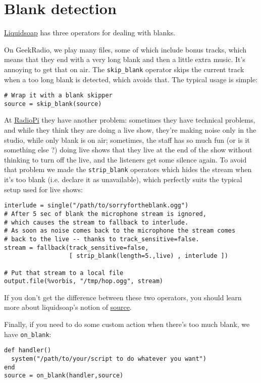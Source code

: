 \section{Blank detection}
\href{index.html}{Liquidsoap} has three operators for dealing with blanks.

On GeekRadio, we play many files, some of which include bonus tracks, which means that they end with a very long blank and then a little extra music. It's annoying to get that on air. The \verb+skip_blank+ operator skips the current track when a too long blank is detected, which avoids that. The typical usage is simple:

\begin{verbatim}
# Wrap it with a blank skipper
source = skip_blank(source)
\end{verbatim}
At \href{http://www.radiopi.org/}{RadioPi} they have another problem: sometimes they have technical problems, and while they think they are doing a live show, they're making noise only in the studio, while only blank is on air; sometimes, the staff has so much fun (or is it something else ?) doing live shows that they live at the end of the show without thinking to turn off the live, and the listeners get some silence again. To avoid that problem we made the \verb+strip_blank+ operators which hides the stream when it's too blank (i.e. declare it as unavailable), which perfectly suits the typical setup used for live shows:

\begin{verbatim}
interlude = single("/path/to/sorryfortheblank.ogg")
# After 5 sec of blank the microphone stream is ignored,
# which causes the stream to fallback to interlude.
# As soon as noise comes back to the microphone the stream comes
# back to the live -- thanks to track_sensitive=false.
stream = fallback(track_sensitive=false,
	              [ strip_blank(length=5.,live) , interlude ])

# Put that stream to a local file
output.file(%vorbis, "/tmp/hop.ogg", stream)
\end{verbatim}
If you don't get the difference between these two operators, you should
learn more about liquidsoap's notion of \href{sources.html}{source}.

Finally, if you need to do some custom action when there's too much blank, we have \verb+on_blank+:

\begin{verbatim}
def handler()
  system("/path/to/your/script to do whatever you want")
end
source = on_blank(handler,source)
\end{verbatim}
